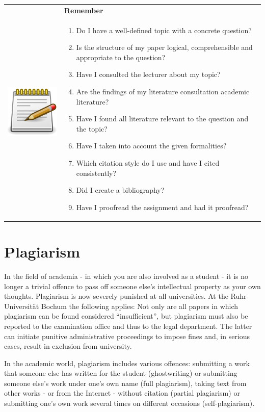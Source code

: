 \documentclass[
  english,
]{scrreprt}
\providecommand{\tightlist}{%
  \setlength{\itemsep}{0pt}\setlength{\parskip}{0pt}}
\newlength{\iconwidth}
\newenvironment{displaybox}[2]{%
    \begin{center}
        \setlength\arrayrulewidth{0.75pt}%
        \arrayrulecolor{white}%
        \renewcommand{\arraystretch}{1.3}%
        \begin{tabular}{p{\iconwidth}p{\linewidth-4\tabcolsep-\iconwidth}}
            \multirow{2}{*}{#2}&\cellcolor{boxheadcol}\textbf{\sffamily\color{white}#1} \\%
            \hhline{~-}%
            &\cellcolor{boxcol}%
}{%
            \\
        \end{tabular}
        \arrayrulecolor{black}
    \end{center}
}
\newenvironment{Remember}{%
\begin{displaybox}{Remember}{\includegraphics[width=\iconwidth]{images/icon-merke}}}%
{\end{displaybox}}
\begin{document}
\begin{Remember}

\begin{enumerate}
\def\labelenumi{\arabic{enumi}.}
\tightlist
\item
  Do I have a well-defined topic with a concrete question?
\item
  Is the structure of my paper logical, comprehensible and appropriate to the question?
\item
  Have I consulted the lecturer about my topic?
\item
  Are the findings of my literature consultation academic literature?
\item
  Have I found all literature relevant to the question and the topic?
\item
  Have I taken into account the given formalities?
\item
  Which citation style do I use and have I cited consistently?
\item
  Did I create a bibliography?
\item
  Have I proofread the assignment and had it proofread?
\end{enumerate}

\end{Remember}

\section{Plagiarism}\label{plagiarism}

In the field of academia - in which you are also involved as a student - it is no longer a trivial offence to pass off someone else’s intellectual property as your own thoughts. Plagiarism is now severely punished at all universities. At the Ruhr-Universität Bochum the following applies: Not only are all papers in which plagiarism can be found considered “insufficient”, but plagiarism must also be reported to the examination office and thus to the legal department. The latter can initiate punitive administrative proceedings to impose fines and, in serious cases, result in exclusion from university.

In the academic world, plagiarism includes various offences: submitting a work that someone else has written for the student (ghostwriting) or submitting someone else’s work under one’s own name (full plagiarism), taking text from other works - or from the Internet - without citation (partial plagiarism) or submitting one’s own work several times on different occasions (self-plagiarism).
\end{document}
